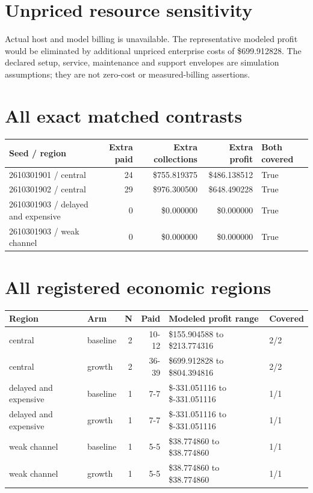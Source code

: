 \documentclass[10pt,letterpaper]{article}
\begin{document}
\section{Unpriced resource sensitivity}
Actual host and model billing is unavailable. The representative modeled profit would be eliminated by additional unpriced enterprise costs of \$699.912828. The declared setup, service, maintenance and support envelopes are simulation assumptions; they are not zero-cost or measured-billing assertions.
\section{All exact matched contrasts}
\small\begin{longtable}{@{}p{4.3cm}r r r p{1.2cm}@{}}
\toprule Seed / region & Extra paid & Extra collections & Extra profit & Both covered \\ \midrule\endhead
2610301901 / central & 24 & \$755.819375 & \$486.138512 & True \\
2610301902 / central & 29 & \$976.300500 & \$648.490228 & True \\
2610301903 / delayed and expensive & 0 & \$0.000000 & \$0.000000 & True \\
2610301903 / weak channel & 0 & \$0.000000 & \$0.000000 & True \\
\bottomrule\end{longtable}\normalsize
{}\section{All registered economic regions}
\small\begin{longtable}{@{}p{2.55cm}p{2.4cm}r r p{4.1cm}p{1.2cm}@{}}
\toprule Region & Arm & N & Paid & Modeled profit range & Covered \\ \midrule\endhead
central & baseline & 2 & 10-12 & \$155.904588 to \$213.774316 & 2/2 \\
central & growth & 2 & 36-39 & \$699.912828 to \$804.394816 & 2/2 \\
delayed and expensive & baseline & 1 & 7-7 & \$-331.051116 to \$-331.051116 & 1/1 \\
delayed and expensive & growth & 1 & 7-7 & \$-331.051116 to \$-331.051116 & 1/1 \\
weak channel & baseline & 1 & 5-5 & \$38.774860 to \$38.774860 & 1/1 \\
weak channel & growth & 1 & 5-5 & \$38.774860 to \$38.774860 & 1/1 \\
\bottomrule\end{longtable}\normalsize
\end{document}
